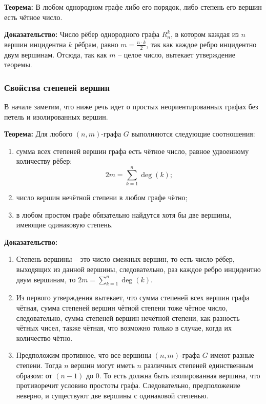 \documentclass[12pt, a4paper]{article}
\begin{document}
\textbf{Теорема:} В любом однородном графе либо его порядок, либо степень его вершин есть чётное число.

\textbf{Доказательство:} Число рёбер однородного графа $R_n^k$, в котором каждая из $n$ вершин инцидентна $k$ рёбрам, равно $m = \frac{n \cdot k}{2}$, так как каждое ребро инцидентно двум вершинам. Отсюда, так как $m$ -- целое число, вытекает утверждение теоремы.

\subsubsection{Свойства степеней вершин}

В начале заметим, что ниже речь идет о простых неориентированных графах без петель и изолированных вершин.

\textbf{Теорема:} Для любого $(n,m)$-графа $G$ выполняются следующие соотношения:
\begin{enumerate}
 \item сумма всех степеней вершин графа есть чётное число, равное удвоенному количеству рёбер:
 \[2m = \sum_{k=1}^n \deg{(k)}; \]
 \item число вершин нечётной степени в любом графе чётно;
 \item в любом простом графе обязательно найдутся хотя бы две вершины, имеющие одинаковую степень.
\end{enumerate}

\textbf{Доказательство:}
\begin{enumerate}
 \item Степень вершины -- это число смежных вершин, то есть число рёбер, выходящих из данной вершины, следовательно, раз каждое ребро инцидентно двум вершинам, то $2m = \sum \limits_{k=1}^n \deg{(k)}$.
 \item Из первого утверждения вытекает, что сумма степеней всех вершин графа чётная, сумма степеней вершин чётной степени тоже чётное число, следовательно, сумма степеней вершин нечётной степени, как разность чётных чисел, также чётная, что возможно только в случае, когда их количество чётно.
 \item Предположим противное, что все вершины $(n,m)$-графа $G$ имеют разные степени. Тогда $n$ вершин могут иметь $n$ различных степеней единственным образом: от $(n-1)$ до $0$. То есть должна быть изолированная вершина, что противоречит условию простоты графа. Следовательно, предположение неверно, и существуют две вершины с одинаковой степенью.
\end{enumerate}
\end{document}
